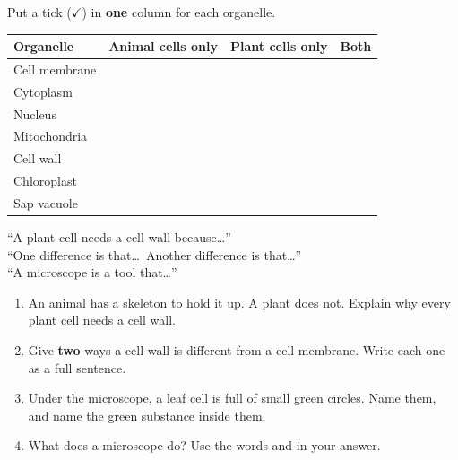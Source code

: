 \documentclass[12pt,a4paper]{article}
\begin{document}

\noindent Put a tick ($\checkmark$) in \textbf{one} column for each organelle.

\vspace{8pt}
\noindent
\begin{tabularx}{\textwidth}{|X|>{\centering\arraybackslash}p{3.1cm}|>{\centering\arraybackslash}p{2.9cm}|>{\centering\arraybackslash}p{1.9cm}|}
  \hline
  \textbf{Organelle} & \textbf{Animal cells only} & \textbf{Plant cells only} & \textbf{Both} \\
  \hline
  Cell membrane & & & \\ \hline
  Cytoplasm     & & & \\ \hline
  Nucleus       & & & \\ \hline
  Mitochondria  & & & \\ \hline
  Cell wall     & & & \\ \hline
  Chloroplast   & & & \\ \hline
  Sap vacuole   & & & \\ \hline
\end{tabularx}


\begin{wordhelp}
  ``A plant cell needs a cell wall because\ldots''\\
  ``One difference is that\ldots\ Another difference is that\ldots''\\
  ``A microscope is a tool that\ldots''
\end{wordhelp}

\begin{enumerate}[label=\arabic*., itemsep=14pt]

  \item An animal has a skeleton to hold it up. A plant does not. Explain why every
        plant cell needs a cell wall.

  \item Give \textbf{two} ways a cell wall is different from a cell membrane.
        Write each one as a full sentence.

  \item Under the microscope, a leaf cell is full of small green circles. Name them,
        and name the green substance inside them.

  \item What does a microscope do? Use the words  and  in your
        answer.

\end{enumerate}
\end{document}
